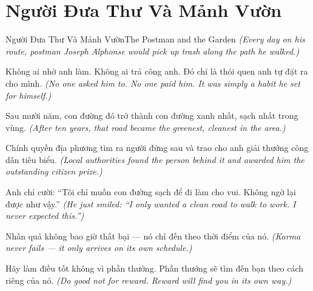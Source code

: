 \section{Người Đưa Thư Và Mảnh Vườn}
\begin{truyen}{Người Đưa Thư Và Mảnh Vườn}{The Postman and the Garden}
\textit{(Every day on his route, postman Joseph Alphonse would pick up trash along the path he walked.)}

Không ai nhờ anh làm. Không ai trả công anh. Đó chỉ là thói quen anh tự đặt ra cho mình.
\textit{(No one asked him to. No one paid him. It was simply a habit he set for himself.)}

Sau mười năm, con đường đó trở thành con đường xanh nhất, sạch nhất trong vùng.
\textit{(After ten years, that road became the greenest, cleanest in the area.)}

Chính quyền địa phương tìm ra người đứng sau và trao cho anh giải thưởng công dân tiêu biểu.
\textit{(Local authorities found the person behind it and awarded him the outstanding citizen prize.)}

Anh chỉ cười: ``Tôi chỉ muốn con đường sạch để đi làm cho vui. Không ngờ lại được như vậy.''
\textit{(He just smiled: ``I only wanted a clean road to walk to work. I never expected this.'')}

Nhân quả không bao giờ thất bại — nó chỉ đến theo thời điểm của nó.
\textit{(Karma never fails — it only arrives on its own schedule.)}

\end{truyen}

\begin{baihoc}
Hãy làm điều tốt không vì phần thưởng. Phần thưởng sẽ tìm đến bạn theo cách riêng của nó.
\textit{(Do good not for reward. Reward will find you in its own way.)}
\end{baihoc}
\ngancach

